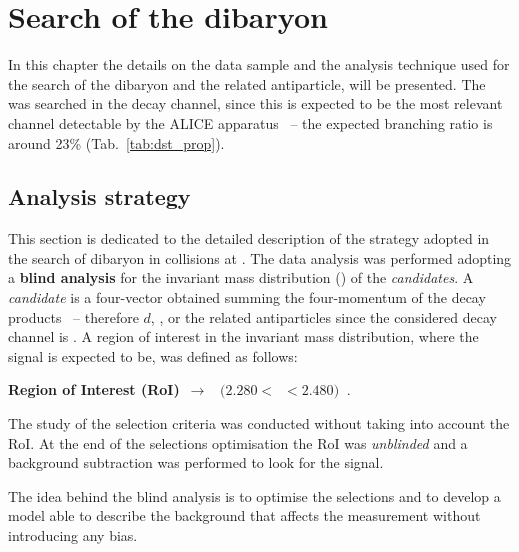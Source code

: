 %
\chapter{Search of the \dst dibaryon} \label{sec:4}


In this chapter the details on the data sample and the analysis technique used for the search of the \dst
dibaryon and the related antiparticle, will be presented. 
The \dst was searched in the \dstdecay decay channel, since this is expected to be the
most relevant channel detectable by the ALICE apparatus \ -- the expected branching ratio is
around 23\% (Tab.~\ref{tab:dst_prop}).

%
%
\section{Analysis strategy} \label{sec:4.1}

This section is dedicated to the detailed description of the strategy adopted in the search of
\dst dibaryon in \pPb collisions at \sctev. 
The data analysis was performed adopting a \textbf{blind analysis} for the invariant mass distribution
(\minv) of the \ds \textit{candidates}. A \ds \textit{candidate} is a four-vector obtained summing the 
four-momentum of the \ds decay products \ -- therefore $d$, \pip, \pim or the related antiparticles since the
considered decay channel is \dstdecay.
A region of interest in the \minv invariant mass distribution, where the \ds signal is expected to be,
was defined as follows:
\begin{center}
\textbf{Region of Interest (RoI)}\  $\rightarrow$ \  $(2.280  < $\ \minv$  < 2.480)\ $ \gevcs.
\end{center}
The study of the selection criteria was conducted without taking into account the RoI. At the end of the 
selections optimisation the RoI was \textit{unblinded} and a background subtraction was performed 
to look for the signal.

The idea behind the blind analysis is to optimise the selections and to develop a model
able to describe the background that affects the measurement without introducing any bias. 

